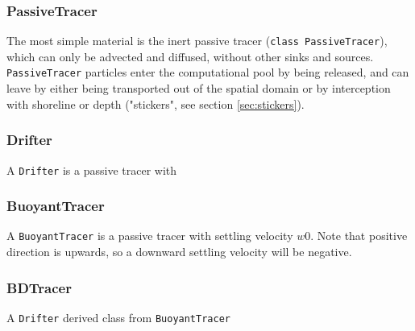 \documentclass[a4paper]{article}
\begin{document}
\subsubsection{PassiveTracer}
\label{sssec:passive}

The most simple material is the inert passive tracer (\texttt{class PassiveTracer}), which can only be advected and diffused, without other sinks and sources. \texttt{PassiveTracer} particles enter the computational pool by being released, and can leave by either being transported out of the spatial domain or by interception with shoreline or depth ("stickers", see section \ref{sec:stickers}).

\subsubsection{Drifter}
\label{sssec:drifter}

A \texttt{Drifter} is a passive tracer with %

\subsubsection{BuoyantTracer}
\label{sssec:buoyant}

A \texttt{BuoyantTracer} is a passive tracer with settling velocity $w0$. Note that positive direction is upwards, so a downward settling velocity will be negative. 


\subsubsection{BDTracer}
\label{sssec:drifter}

A \texttt{Drifter} derived class from  \texttt{BuoyantTracer}
\end{document}
